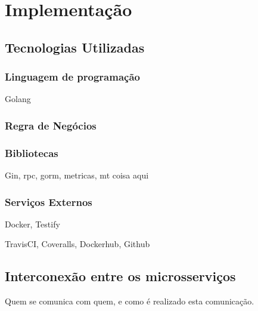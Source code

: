 \chapter{Implementação}
\label{cap5}

\section{Tecnologias Utilizadas}

\subsection{Linguagem de programação}

Golang

\subsection{Regra de Negócios}

\subsection{Bibliotecas}

Gin, \ac{rpc}, gorm, metricas, mt coisa aqui

\subsection{Serviços Externos}

Docker, Testify

TravisCI, Coveralls, Dockerhub, Github

\section{Interconexão entre os microsserviços}

Quem se comunica com quem, e como é realizado esta comunicação.
